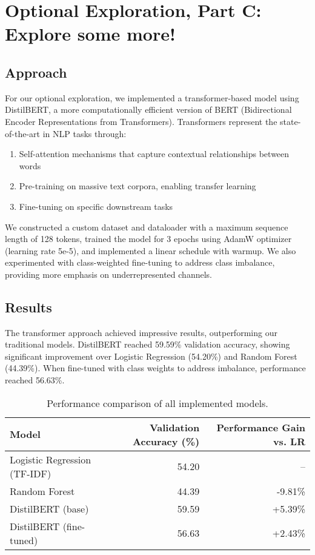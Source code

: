 \documentclass[11pt]{article}
\begin{document}
\section{Optional Exploration, Part C: Explore some more!}
\subsection{Approach}

For our optional exploration, we implemented a transformer-based model using DistilBERT, a more computationally efficient version of BERT (Bidirectional Encoder Representations from Transformers). Transformers represent the state-of-the-art in NLP tasks through:

\begin{enumerate}
    \item Self-attention mechanisms that capture contextual relationships between words
    \item Pre-training on massive text corpora, enabling transfer learning
    \item Fine-tuning on specific downstream tasks
\end{enumerate}

We constructed a custom dataset and dataloader with a maximum sequence length of 128 tokens, trained the model for 3 epochs using AdamW optimizer (learning rate 5e-5), and implemented a linear schedule with warmup. We also experimented with class-weighted fine-tuning to address class imbalance, providing more emphasis on underrepresented channels.

\subsection{Results}

The transformer approach achieved impressive results, outperforming our traditional models. DistilBERT reached 59.59\% validation accuracy, showing significant improvement over Logistic Regression (54.20\%) and Random Forest (44.39\%). When fine-tuned with class weights to address imbalance, performance reached 56.63\%.

\begin{table}
\centering
\begin{tabularx}{\textwidth}{Xrr}
 \toprule
 Model & Validation Accuracy (\%) & Performance Gain vs. LR \\
 \midrule
 Logistic Regression (TF-IDF) & 54.20 & -- \\
 Random Forest & 44.39 & -9.81\% \\
 DistilBERT (base) & 59.59 & +5.39\% \\
 DistilBERT (fine-tuned) & 56.63 & +2.43\% \\
 \bottomrule
\end{tabularx}
\caption{\label{tab:transformer_results} Performance comparison of all implemented models.}
\end{table}
\end{document}

